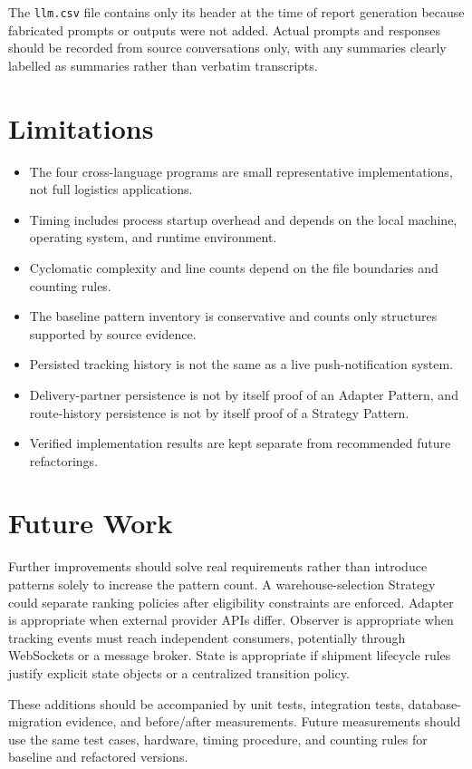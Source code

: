 \documentclass[12pt,a4paper]{article}
\begin{document}
The \texttt{llm.csv} file contains only its header at the time of report generation because fabricated prompts or outputs were not added. Actual prompts and responses should be recorded from source conversations only, with any summaries clearly labelled as summaries rather than verbatim transcripts.

\section{Limitations}
\begin{itemize}
    \item The four cross-language programs are small representative implementations, not full logistics applications.
    \item Timing includes process startup overhead and depends on the local machine, operating system, and runtime environment.
    \item Cyclomatic complexity and line counts depend on the file boundaries and counting rules.
    \item The baseline pattern inventory is conservative and counts only structures supported by source evidence.
    \item Persisted tracking history is not the same as a live push-notification system.
    \item Delivery-partner persistence is not by itself proof of an Adapter Pattern, and route-history persistence is not by itself proof of a Strategy Pattern.
    \item Verified implementation results are kept separate from recommended future refactorings.
\end{itemize}

\section{Future Work}
Further improvements should solve real requirements rather than introduce patterns solely to increase the pattern count. A warehouse-selection Strategy could separate ranking policies after eligibility constraints are enforced. Adapter is appropriate when external provider APIs differ. Observer is appropriate when tracking events must reach independent consumers, potentially through WebSockets or a message broker. State is appropriate if shipment lifecycle rules justify explicit state objects or a centralized transition policy.

These additions should be accompanied by unit tests, integration tests, database-migration evidence, and before/after measurements. Future measurements should use the same test cases, hardware, timing procedure, and counting rules for baseline and refactored versions.
\end{document}
